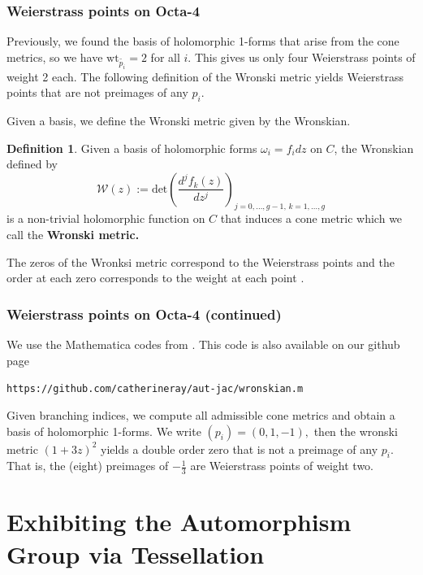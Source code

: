 \documentclass[12pt,reqno]{amsart}
\theoremstyle{definition}
\newtheorem{defn}{Definition}
\theoremstyle{remark}
\begin{document}
\subsubsection*{Weierstrass points on Octa-4} Previously, we found the basis of holomorphic 1-forms that arise from the cone metrics, so we have $\textrm{wt}_{\widetilde{p_i}} = 2$ for all $i.$ This gives us only four Weierstrass points of weight 2 each. The following definition of the Wronski metric yields Weierstrass points that are not preimages of any $p_i.$

Given a basis, we define the Wronski metric given by the Wronskian.

\begin{defn}\label{def: wronski} Given a basis of holomorphic forms $\omega_i = f_i d z$ on $C$, the Wronskian defined by $$\mathcal{W}(z) := \textrm{det} \left( \frac{d^j f_k(z)}{d z^j} \right)_{j = 0, \ldots , g - 1, \, k = 1, \ldots , g}$$ is a non-trivial holomorphic function on $C$ that induces a cone metric which we call the \textbf{Wronski metric.} \end{defn}

The zeros of the Wronksi metric correspond to the Weierstrass points and the order at each zero corresponds to the weight at each point \cite{fk}. 

\subsubsection*{Weierstrass points on Octa-4 (continued)} We use the Mathematica codes from \cite{dthesis}. This code is also available on our github page \begin{center}\texttt{https://github.com/catherineray/aut-jac/wronskian.m}\end{center} Given branching indices, we compute all admissible cone metrics and obtain a basis of holomorphic 1-forms. We write $(p_i) = (0, 1, -1),$ then the wronski metric $(1 + 3 z)^2$ yields a double order zero that is not a preimage of any $p_i.$ That is, the (eight) preimages of $- \frac{1}{3}$ are Weierstrass points of weight two. 



\section{Exhibiting the Automorphism Group via Tessellation}
\label{sec:flagflag}
\end{document}
